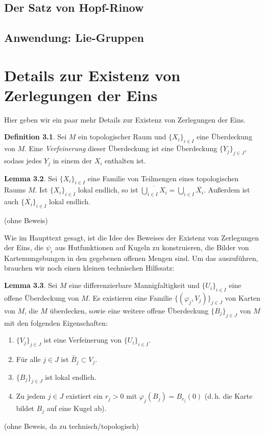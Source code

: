 \documentclass[a4paper]{scrreprt}
\numberwithin{equation}{chapter}
\theoremstyle{definition}
\newtheorem{defn}{Definition}[section]
\newtheorem{lemma}[defn]{Lemma}
\begin{document}
	\section{Der Satz von Hopf-Rinow}
	\section{Anwendung: Lie-Gruppen}


\appendix
{} %
\chapter{Details zur Existenz von Zerlegungen der Eins}
\label{appendix:details_zerl_eins}
Hier geben wir ein paar mehr Details zur Existenz von Zerlegungen der Eins.
\begin{defn}
	Sei $M$ ein topologischer Raum und $\{X_i\}_{i\in I}$ eine Überdeckung von $M$. Eine \emph{Verfeinerung} dieser Überdeckung ist eine Überdeckung $\{Y_j\}_{j\in J}$, sodass jedes $Y_j$ in einem der $X_i$ enthalten ist.
\end{defn}
\begin{lemma} \label{lemma:lok_endl_abschluss}
	Sei $\{X_i\}_{i\in I}$ eine Familie von Teilmengen eines topologischen Raums $M$. Ist $\{X_i\}_{i\in I}$ lokal endlich, so ist $\overline{\bigcup_{i\in I} X_i} = \bigcup_{i\in I} \overline{X_i}$. Außerdem ist auch $\{\overline{X_i}\}_{i\in I}$ lokal endlich.

	(ohne Beweis)
\end{lemma}
Wie im Haupttext gesagt, ist die Idee des Beweises der Existenz von Zerlegungen der Eins, die $\psi_i$ aus Hutfunktionen auf Kugeln zu konstruieren, die Bilder von Kartenumgebungen in den gegebenen offenen Mengen sind. Um das auszuführen, brauchen wir noch einen kleinen technischen Hilfssatz:
\begin{lemma}
	Sei $M$ eine differenzierbare Mannigfaltigkeit und $\{U_i\}_{i\in I}$ eine offene Überdeckung von $M$. Es existieren eine Familie $\{(\varphi_j,V_j)\}_{j\in J}$ von Karten von $M$, die $M$ überdecken, sowie eine weitere offene Überdeckung $\{B_j\}_{j\in J}$ von $M$ mit den folgenden Eigenschaften:
	\begin{enumerate}[label=(\roman*)]
		\item $\{V_j\}_{j\in J}$ ist eine Verfeinerung von $\{U_i\}_{i\in I}$.
		\item Für alle $j\in J$ ist $\bar B_j \subset V_j$.
		\item $\{B_j\}_{j\in J}$ ist lokal endlich.
		\item Zu jedem $j\in J$ existiert ein $r_j > 0$ mit $\varphi_j(B_j) = B_{r_j}(0)$ (d.\,h. die Karte bildet $B_j$ auf eine Kugel ab).
	\end{enumerate}

	(ohne Beweis, da zu technisch/topologisch)
\end{lemma}
\end{document}
